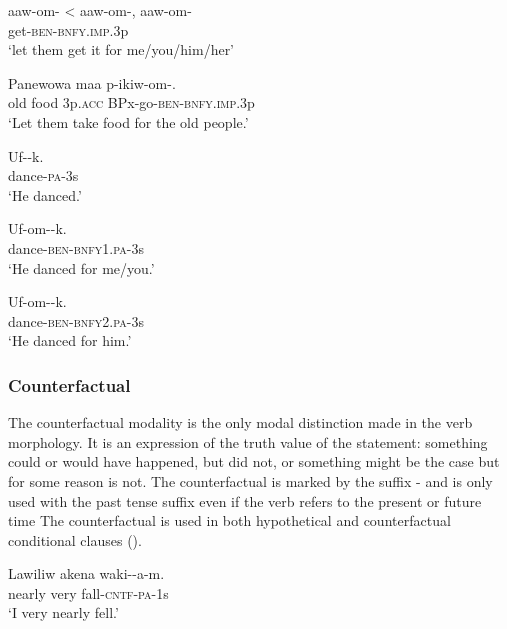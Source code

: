 \ea%
\label{ex:3:x1750}
\gll aaw-om- {{\textless} aaw-om-}, aaw-om- \\
get-\textsc{ben}-\textsc{bnfy}.\textsc{imp}.3p\\
\glt`let them get it for me/you/him/her'
\z

\ea%
\label{ex:3:x445}
\gll Panewowa maa  p-ikiw-om-. \\
old food 3p.\textsc{acc} BPx-go-\textsc{ben}-\textsc{bnfy}.\textsc{imp}.3p\\
\glt`Let them take food for the old people.'
\z

\ea%
\label{ex:3:x494}
\gll Uf--k. \\
dance-\textsc{pa}-3s\\
\glt`He danced.'
\z

\ea%
\label{ex:3:x495}
\gll Uf-om--k. \\
dance-\textsc{ben}-\textsc{bnfy}1.\textsc{pa}-3s\\
\glt`He danced for me/you.'
\z

\ea%
\label{ex:3:x496}
\gll Uf-om--k. \\
dance-\textsc{ben}-\textsc{bnfy}2.\textsc{pa}-3s\\
\glt`He danced for him.'
\z

\subsubsection{Counterfactual}\label{sec:3:z:y:x}
{}
The counterfactual modality is the only modal distinction made in the verb morphology. It is an expression of the truth value of the statement: something could or would have happened, but did not, or something might be the case but for some reason is not. The counterfactual is marked by the suffix \nobreakdash-  and is only used with the past tense suffix even if the verb refers to the present  or future  time The counterfactual is used in both hypothetical and counterfactual conditional clauses (). 

\ea%
\label{ex:3:x234}
\gll Lawiliw akena waki--a-m. \\
nearly very fall-\textsc{cntf}-\textsc{pa}-1s \\
\glt`I very nearly fell.' 
\z

